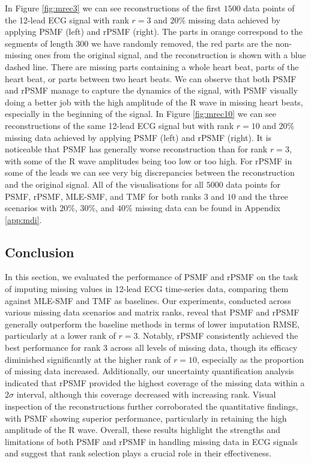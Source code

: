 \documentclass{mldsmsc}
\begin{document}
\noindent In Figure \ref{fig:mrec3} we can see reconstructions of the first $1500$ data points of the 12-lead ECG signal with rank $r = 3$ and $20\%$ missing data achieved by applying PSMF (left) and rPSMF (right). The parts in orange correspond to the segments of length $300$ we have randomly removed, the red parts are the non-missing ones from the original signal, and the reconstruction is shown with a blue dashed line. There are missing parts containing a whole heart beat, parts of the heart beat, or parts between two heart beats. We can observe that both PSMF and rPSMF manage to capture the dynamics of the signal, with PSMF visually doing a better job with the high amplitude of the R wave in missing heart beats, especially in the beginning of the signal. In Figure \ref{fig:mrec10} we can see reconstructions of the same 12-lead ECG signal but with rank $r = 10$ and $20\%$ missing data achieved by applying PSMF (left) and rPSMF (right). It is noticeable that PSMF has generally worse reconstruction than for rank $r = 3$, with some of the R wave amplitudes being too low or too high. For rPSMF in some of the leads we can see very big discrepancies between the reconstruction and the original signal. All of the visualisations for all $5000$ data points for PSMF, rPSMF, MLE-SMF, and TMF for both ranks $3$ and $10$ and the three scenarios with $20\%$, $30\%$, and $40\%$ missing data can be found in Appendix \ref{app:mdi}. \newline

\subsection{Conclusion}

\noindent In this section, we evaluated the performance of PSMF and rPSMF on the task of imputing missing values in 12-lead ECG time-series data, comparing them against MLE-SMF and TMF as baselines. Our experiments, conducted across various missing data scenarios and matrix ranks, reveal that PSMF and rPSMF generally outperform the baseline methods in terms of lower imputation RMSE, particularly at a lower rank of $r = 3$. Notably, rPSMF consistently achieved the best performance for rank $3$ across all levels of missing data, though its efficacy diminished significantly at the higher rank of $r = 10$, especially as the proportion of missing data increased. Additionally, our uncertainty quantification analysis indicated that rPSMF provided the highest coverage of the missing data within a $2\sigma$ interval, although this coverage decreased with increasing rank. Visual inspection of the reconstructions further corroborated the quantitative findings, with PSMF showing superior performance, particularly in retaining the high amplitude of the R wave. Overall, these results highlight the strengths and limitations of both PSMF and rPSMF in handling missing data in ECG signals and suggest that rank selection plays a crucial role in their effectiveness.
\end{document}
